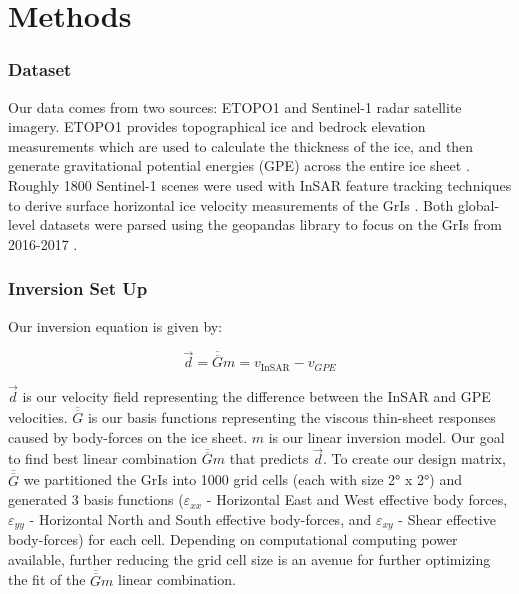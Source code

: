 \documentclass{article}
\begin{document}

\section{Methods}

\subsubsection{Dataset}
Our data comes from two sources: ETOPO1 and Sentinel-1 radar satellite imagery. ETOPO1 provides topographical ice and bedrock elevation measurements which are used to calculate the thickness of the ice, and then generate gravitational potential energies (GPE) across the entire ice sheet \cite{information_ncei_etopo1_nodate}. Roughly 1800 Sentinel-1 scenes were used with InSAR feature tracking techniques to derive surface horizontal ice velocity measurements of the GrIs \cite{nagler_sentinel-1_2015}. Both global-level datasets were parsed using the geopandas library to focus on the GrIs from 2016-2017 \cite{jordahl_geopandasgeopandas_2020}. 



\subsubsection{Inversion Set Up}

Our inversion equation is given by:

$$
\vec{d}=\overline{\overline{G}} m=v_{\text {InSAR}}-v_{GPE}
$$

$\vec{d}$ is our velocity field representing the difference between the InSAR and GPE velocities. $\overline{\overline{G}}$ is our basis functions representing the viscous thin-sheet responses caused by body-forces on the ice sheet. $m$ is our linear inversion model. Our goal to find best linear combination $\overline{\overline{G}} m$ that predicts $\vec{d}$. To create our design matrix, $\overline{\overline{G}}$ we partitioned the GrIs into 1000 grid cells (each with size 2° x 2°) and generated 3 basis functions ($\varepsilon_{xx}$ - Horizontal East and West effective body forces, $\varepsilon_{yy}$ - Horizontal North and South effective body-forces, and $\varepsilon_{xy}$ - Shear effective body-forces) for each cell. Depending on computational computing power available, further reducing the grid cell size is an avenue for further optimizing the fit of the  $\overline{\overline{G}} m$ linear combination.   
\end{document}

